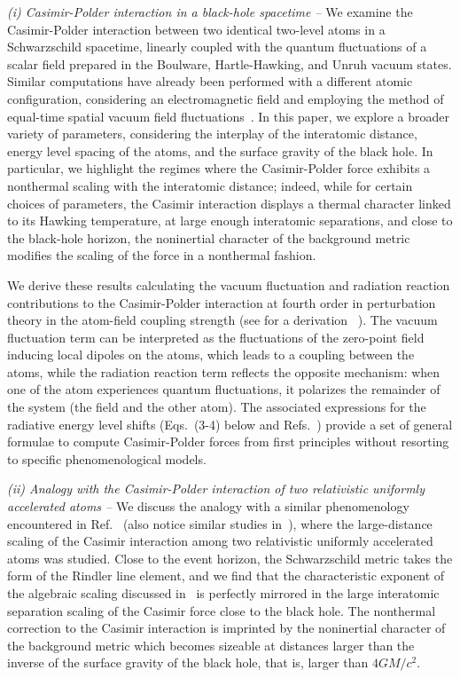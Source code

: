 \documentclass[twocolumn,prd,aps,showpacs,amsmath,amssymb]{revtex4-1}
\begin{document}
\emph{(i) Casimir-Polder interaction in a black-hole spacetime --}
We examine the Casimir-Polder interaction between two identical
two-level atoms in a Schwarzschild spacetime, linearly coupled with
the quantum fluctuations of a scalar field prepared in the Boulware, Hartle-Hawking, and Unruh
vacuum states.  
%
Similar computations have already been performed with a different
atomic configuration, considering an electromagnetic field and
employing the method of equal-time spatial vacuum field
fluctuations~\cite{bh}. In this paper, we explore a broader variety of
parameters, considering the interplay of the interatomic distance,  energy level spacing
of the atoms, and the surface gravity of the black hole. 
%
In particular, we highlight the regimes where the Casimir-Polder force
exhibits a nonthermal scaling with the interatomic distance; indeed,
while for certain choices of parameters, the Casimir interaction
displays a thermal character linked to its Hawking temperature, at
large enough interatomic separations, and close to the black-hole
horizon, the noninertial character of the background metric modifies
the scaling of the force in a nonthermal fashion. 
%

We derive these results calculating the vacuum fluctuation and radiation reaction contributions to the Casimir-Polder interaction at fourth order in perturbation theory in the atom-field coupling strength (see for a derivation ~\cite{noto}).
The vacuum fluctuation term can be interpreted as the fluctuations of
the zero-point field inducing local dipoles on the atoms, which leads
to a coupling between the atoms,
while the radiation reaction term reflects the opposite
mechanism: when one of the atom experiences quantum fluctuations, it
polarizes the remainder 
of the system (the field and the other atom). 
The associated expressions for the radiative energy level shifts
(Eqs.~(3-4) below and Refs.~\cite{marino, noto}) provide a set of  general formulae to compute
Casimir-Polder forces from first principles without resorting to
specific phenomenological models. 


\emph{(ii) Analogy with the Casimir-Polder interaction of two
  relativistic uniformly accelerated atoms --} We discuss the analogy
with a similar phenomenology encountered in Ref.~\cite{marino} (also
notice similar studies in~\cite{rizzutoUnruh}), where the large-distance
scaling of the Casimir interaction among two relativistic
uniformly accelerated atoms was studied. 
%
Close to the event horizon, the Schwarzschild metric takes the form of
the Rindler line element, and we find that the characteristic exponent
of the algebraic scaling discussed in~\cite{marino} is perfectly
mirrored in the large interatomic separation scaling of the Casimir
force close to the black hole. The nonthermal correction to the
Casimir interaction is imprinted by the noninertial character of the
background metric which becomes sizeable at distances larger than the
inverse of the surface gravity of the black hole, that is, larger than
$4GM/c^2$.
\end{document}
